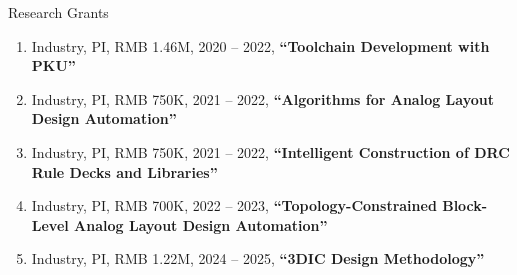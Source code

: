 \begin{rSection}{Research Grants}
\begin{enumerate}[font=\normalfont]
\item Industry, PI, RMB 1.46M, 2020 -- 2022, \textbf{``Toolchain Development with PKU''}

\item Industry, PI, RMB 750K, 2021 -- 2022, \textbf{``Algorithms for Analog Layout Design Automation''}

\item Industry, PI, RMB 750K, 2021 -- 2022, \textbf{``Intelligent Construction of DRC Rule Decks and Libraries''}

\item Industry, PI, RMB 700K, 2022 -- 2023, \textbf{``Topology-Constrained Block-Level Analog Layout Design Automation''}

\item Industry, PI, RMB 1.22M, 2024 -- 2025, \textbf{``3DIC Design Methodology''}

\end{enumerate}

\end{rSection}

